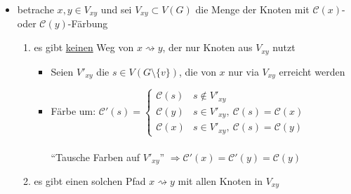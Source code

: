 \begin{description}
\begin{description}
\begin{enumerate}
\begin{itemize}
                            \item betrache $x,y \in V_{xy}$ und sei $V_{xy} \subset V(G)$ die Menge der Knoten mit $\mathcal{C}(x)$- oder $\mathcal{C}(y)$-Färbung
                                \begin{enumerate}
                                    \item es gibt \underline{keinen} Weg von $x \rightsquigarrow y$, der nur Knoten aus $V_{xy}$ nutzt
                                        \begin{itemize}
                                            \item Seien $V'_{xy}$ die $s \in V(G \setminus \{v\})$, die von $x$ nur via $V_{xy}$ erreicht werden
                                            \item Färbe um:
                                            \begin{math}
                                                \mathcal{C'}(s) =
                                                    \begin{cases}
                                                        \mathcal{C}(s) & s \not \in V'_{xy}\\
                                                        \mathcal{C}(y) & s \in V'_{xy}, ~ \mathcal{C}(s) = \mathcal{C}(x)\\
                                                        \mathcal{C}(x) & s \in V'_{xy}, ~ \mathcal{C}(s) = \mathcal{C}(y)
                                                    \end{cases}
                                            \end{math}\\\\
                                            ``Tausche Farben auf $V'_{xy}$'' $\Rightarrow \mathcal{C'}(x) = \mathcal{C'}(y) = \mathcal{C}(y)$
                                        \end{itemize}
                                    \item es gibt einen solchen Pfad $x \rightsquigarrow y$ mit allen Knoten in $V_{xy}$

\end{enumerate}
\end{itemize}
\end{enumerate}
\end{description}
\end{description}
